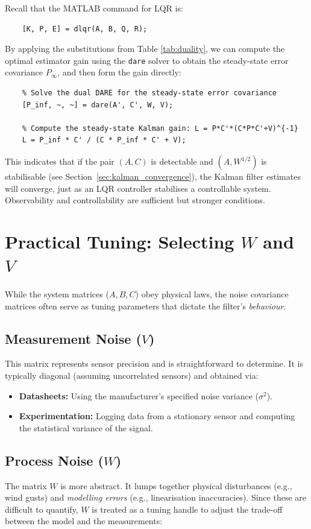 Recall that the MATLAB command for LQR is:
\begin{lstlisting}
	[K, P, E] = dlqr(A, B, Q, R);
\end{lstlisting}

By applying the substitutions from Table \ref{tab:duality}, we can compute the optimal estimator gain using the \texttt{dare} solver to obtain the steady-state error covariance $P_\infty$, and then form the gain directly:
\begin{lstlisting}
	% Solve the dual DARE for the steady-state error covariance
	[P_inf, ~, ~] = dare(A', C', W, V);

	% Compute the steady-state Kalman gain: L = P*C'*(C*P*C'+V)^{-1}
	L = P_inf * C' / (C * P_inf * C' + V);
\end{lstlisting}
This indicates that if the pair $(A, C)$ is detectable and $(A, W^{1/2})$ is stabilisable (see Section~\ref{sec:kalman_convergence}), the Kalman filter estimates will converge, just as an LQR controller stabilises a controllable system. Observability and controllability are sufficient but stronger conditions.


\section{Practical Tuning: Selecting $W$ and $V$}

While the system matrices ($A, B, C$) obey physical laws, the noise covariance matrices often serve as tuning parameters that dictate the filter's \emph{behaviour}.

\subsection{Measurement Noise ($V$)}
This matrix represents sensor precision and is straightforward to determine. It is typically diagonal (assuming uncorrelated sensors) and obtained via:
\begin{itemize}
	\item \textbf{Datasheets:} Using the manufacturer's specified noise variance ($\sigma^2$).
	\item \textbf{Experimentation:} Logging data from a stationary sensor and computing the statistical variance of the signal.
\end{itemize}

\subsection{Process Noise ($W$) }
The matrix $W$ is more abstract. It lumps together physical disturbances (e.g., wind gusts) and \emph{modelling errors} (e.g., linearisation inaccuracies). Since these are difficult to quantify, $W$ is treated as a tuning handle to adjust the trade-off between the model and the measurements:

